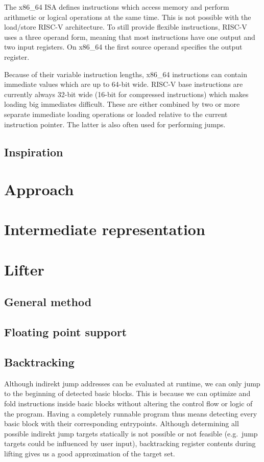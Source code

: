 \documentclass[course=eragp]{aspdoc}
\begin{document}
\par

The x86\_64 ISA defines instructions which access memory and perform arithmetic or logical
operations at the same time. This is not possible with the load/store RISC-V architecture. To still
provide flexible instructions, RISC-V uses a three operand form, meaning that most instructions have
one output and two input registers. On x86\_64 the first source operand specifies the output
register.

\par

Because of their variable instruction lengths, x86\_64 instructions can contain immediate
values which are up to 64-bit wide.\cite[Vol.~2B~p.~4-35]{intel2017man} RISC-V base instructions are
currently always 32-bit wide (16-bit for compressed instructions)\cite[p.~8]{rvspec} which makes
loading big immediates difficult. These are either combined by two or more separate immediate
loading operations or loaded relative to the current instruction pointer.\cite[p.~19]{rvspec} The
latter is also often used for performing jumps.\cite [p.~20]{rvspec}

\subsection{Inspiration}

\section{Approach}

\section{Intermediate representation}

\section{Lifter}
\subsection{General method}
\subsection{Floating point support}
\subsection{Backtracking}
Although indirekt jump addresses can be evaluated at runtime, we can only jump to the beginning of
detected basic blocks. This is because we can optimize  and fold 
instructions  inside basic blocks without altering the control flow or
logic of the program. Having a completely runnable program thus means detecting every basic block
with their corresponding entrypoints. Although determining all possible indirekt jump targets
statically is not possible or not feasible (e.g.\ jump targets could be influenced by user input),
backtracking register contents during lifting gives us a good approximation of the target set.
\end{document}
